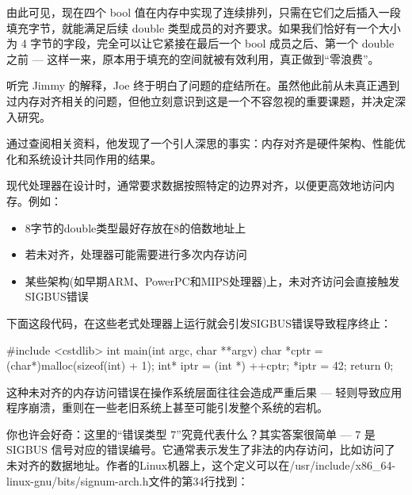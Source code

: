 
由此可见，现在四个 bool 值在内存中实现了连续排列，只需在它们之后插入一段填充字节，就能满足后续 double 类型成员的对齐要求。如果我们恰好有一个大小为 4 字节的字段，完全可以让它紧接在最后一个 bool 成员之后、第一个 double 之前 --- 这样一来，原本用于填充的空间就被有效利用，真正做到“零浪费”。

听完 Jimmy 的解释，Joe 终于明白了问题的症结所在。虽然他此前从未真正遇到过内存对齐相关的问题，但他立刻意识到这是一个不容忽视的重要课题，并决定深入研究。

通过查阅相关资料，他发现了一个引人深思的事实：内存对齐是硬件架构、性能优化和系统设计共同作用的结果。

现代处理器在设计时，通常要求数据按照特定的边界对齐，以便更高效地访问内存。例如：

\begin{itemize}
\item 
8字节的double类型最好存放在8的倍数地址上

\item 
若未对齐，处理器可能需要进行多次内存访问

\item 
某些架构(如早期ARM、PowerPC和MIPS处理器)上，未对齐访问会直接触发SIGBUS错误
\end{itemize}

下面这段代码，在这些老式处理器上运行就会引发SIGBUS错误导致程序终止：

\begin{cpp}
#include <cstdlib>
int main(int argc, char **argv) {
  char *cptr = (char*)malloc(sizeof(int) + 1);
  int* iptr = (int *) ++cptr;
  *iptr = 42;
  return 0;
}
\end{cpp}

这种未对齐的内存访问错误在操作系统层面往往会造成严重后果 --- 轻则导致应用程序崩溃，重则在一些老旧系统上甚至可能引发整个系统的宕机。


你也许会好奇：这里的“错误类型 7”究竟代表什么？其实答案很简单 --- 7 是 SIGBUS 信号对应的错误编号。它通常表示发生了非法的内存访问，比如访问了未对齐的数据地址。作者的Linux机器上，这个定义可以在/usr/include/x86\_64-linux-gnu/bits/signum-arch.h文件的第34行找到：

